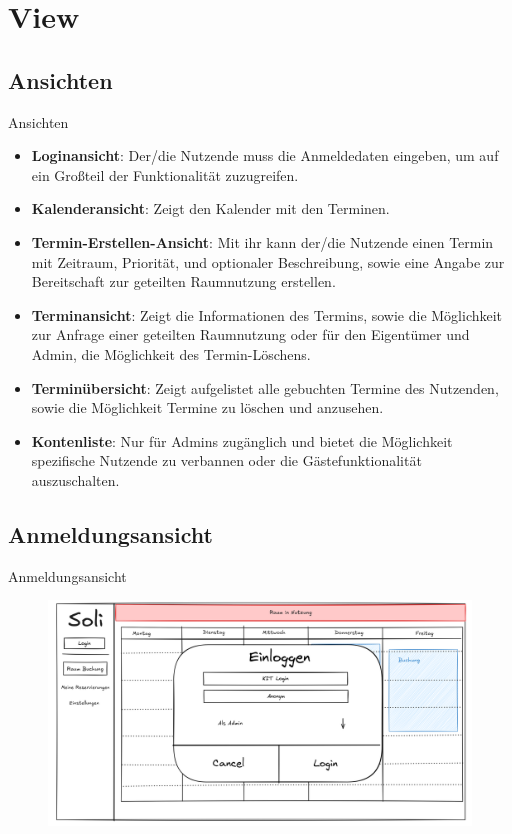 \documentclass{sdqbeamer}
\begin{document}
\section{View}

\subsection{Ansichten}
\begin{frame}{Ansichten}
    \begin{itemize}
        \item \textbf{Loginansicht}: Der/die Nutzende muss die Anmeldedaten eingeben, um auf ein Großteil der Funktionalität zuzugreifen.
        \item \textbf{Kalenderansicht}: Zeigt den Kalender mit den Terminen.
        \item \textbf{Termin-Erstellen-Ansicht}: Mit ihr kann der/die Nutzende einen Termin mit Zeitraum, Priorität, und optionaler Beschreibung, sowie eine Angabe zur Bereitschaft zur geteilten Raumnutzung erstellen.
        \item \textbf{Terminansicht}: Zeigt die Informationen des Termins, sowie die Möglichkeit zur Anfrage einer geteilten Raumnutzung oder für den Eigentümer und Admin, die Möglichkeit des Termin-Löschens.
        \item \textbf{Terminübersicht}: Zeigt aufgelistet alle gebuchten Termine des Nutzenden, sowie die Möglichkeit Termine zu löschen und anzusehen.
        \item \textbf{Kontenliste}: Nur für Admins zugänglich und bietet die Möglichkeit spezifische Nutzende zu verbannen oder die Gästefunktionalität auszuschalten.
    \end{itemize}
\end{frame}

\subsection{Anmeldungsansicht}
\begin{frame}{Anmeldungsansicht}
    \begin{figure}
        \centering
        \includegraphics[width=\textwidth]{pictures/figures/ui/anmeldungsseite}
        \label{fig:login}
    \end{figure}
\end{frame}
\end{document}
